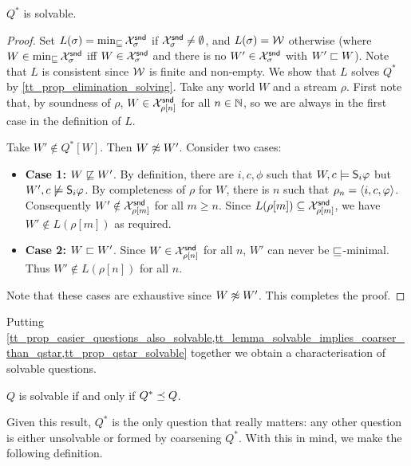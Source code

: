 \begin{proposition}
    \label{tt_prop_qstar_solvable}
    $Q^*$ is solvable.
\end{proposition}

\begin{proof}
    Set $L(\sigma) = \min_{\specleq}{\Xsnd_\sigma}$ if $\Xsnd_\sigma \ne
    \emptyset$, and $L(\sigma) = \worlds$ otherwise (where $W \in
    \min_{\specleq}{\Xsnd_\sigma}$ iff $W \in \Xsnd_\sigma$ and there is no
    $W' \in \Xsnd_\sigma$ with $W' \speclt W$). Note that $L$ is consistent
    since $\worlds$ is finite and non-empty. We show that $L$ solves $Q^*$ by
    \cref{tt_prop_elimination_solving}. Take any world $W$ and a stream $\rho$.
    First note that, by soundness of $\rho$, $W \in \Xsnd_{\rho[n]}$ for all $n
    \in \N$, so we are always in the first case in the definition of $L$.

    Take $W' \notin Q^*[W]$. Then $W \not\speceq W'$. Consider two cases:
    \begin{itemize}
        \item \textbf{Case 1:} $W \not\specleq W'$. By definition, there are
              $i, c, \phi$ such that $W, c \models \S_i\phi$ but $W', c
              \not\models \S_i\phi$. By completeness of $\rho$ for $W$, there
              is $n$ such that $\rho_n = \tuple{i, c, \phi}$. Consequently $W'
              \notin \Xsnd_{\rho[m]}$ for all $m \ge n$. Since $L(\rho[m])
              \subseteq \Xsnd_{\rho[m]}$, we have $W' \notin L(\rho[m])$ as
              required.

        \item \textbf{Case 2:} $W \speclt W'$. Since $W \in \Xsnd_{\rho[n]}$
              for all $n$, $W'$ can never be $\specleq$-minimal. Thus $W'
              \notin L(\rho[n])$ for all $n$.
    \end{itemize}
    Note that these cases are exhaustive since $W \not\speceq W'$. This
    completes the proof.
\end{proof}

Putting
\cref{tt_prop_easier_questions_also_solvable,tt_lemma_solvable_implies_coarser_than_qstar,tt_prop_qstar_solvable}
together we obtain a characterisation of solvable questions.

\begin{theorem}
    \label{tt_thm_solvability_characterisation}
    $Q$ is solvable if and only if $Q^* \refines Q$.
\end{theorem}

Given this result, $Q^*$ is the only question that really matters: any other
question is either unsolvable or formed by coarsening $Q^*$. With this in mind,
we make the following definition.

